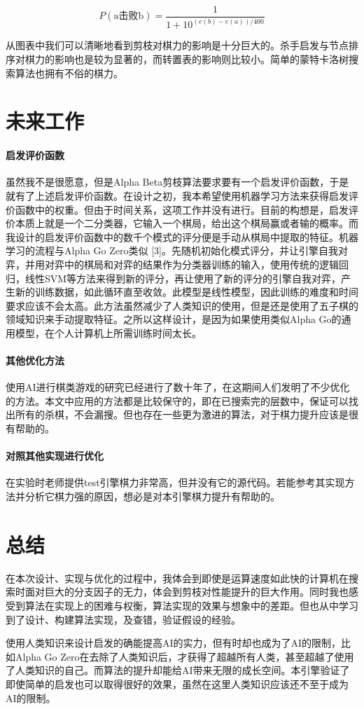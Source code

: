 \documentclass{article}
\begin{document}
\begin{equation}
    P(\mbox{a击败b})=\frac{1}{1+10^{(e(b)-e(a))/400}}
\end{equation}

从图表中我们可以清晰地看到剪枝对棋力的影响是十分巨大的。杀手启发与节点排序对棋力的影响也是较为显著的，而转置表的影响则比较小。简单的蒙特卡洛树搜索算法也拥有不俗的棋力。

\section{未来工作}
\paragraph{启发评价函数} 虽然我不是很愿意，但是Alpha Beta剪枝算法要求要有一个启发评价函数，于是就有了上述启发评价函数。在设计之初，我本希望使用机器学习方法来获得启发评价函数中的权重。但由于时间关系，这项工作并没有进行。目前的构想是，启发评价本质上就是一个二分类器，它输入一个棋局，给出这个棋局赢或者输的概率。而我设计的启发评价函数中的数千个模式的评分便是手动从棋局中提取的特征。机器学习的流程与Alpha Go Zero类似 [3]。先随机初始化模式评分，并让引擎自我对弈，并用对弈中的棋局和对弈的结果作为分类器训练的输入，使用传统的逻辑回归，线性SVM等方法来得到新的评分，再让使用了新的评分的引擎自我对弈，产生新的训练数据，如此循环直至收敛。此模型是线性模型，因此训练的难度和时间要求应该不会太高。此方法虽然减少了人类知识的使用，但是还是使用了五子棋的领域知识来手动提取特征。之所以这样设计，是因为如果使用类似Alpha Go的通用模型，在个人计算机上所需训练时间太长。

\paragraph{其他优化方法} 使用AI进行棋类游戏的研究已经进行了数十年了，在这期间人们发明了不少优化的方法。本文中应用的方法都是比较保守的，即在已搜索完的层数中，保证可以找出所有的杀棋，不会漏搜。但也存在一些更为激进的算法，对于棋力提升应该是很有帮助的。

\paragraph{对照其他实现进行优化} 在实验时老师提供test引擎棋力非常高，但并没有它的源代码。若能参考其实现方法并分析它棋力强的原因，想必是对本引擎棋力提升有帮助的。

\section{总结}

在本次设计、实现与优化的过程中，我体会到即使是运算速度如此快的计算机在搜索时面对巨大的分支因子的无力，体会到剪枝对性能提升的巨大作用。同时我也感受到算法在实现上的困难与权衡，算法实现的效果与想象中的差距。但也从中学习到了设计、构建算法实现，及查错，验证假设的经验。

使用人类知识来设计启发的确能提高AI的实力，但有时却也成为了AI的限制，比如Alpha Go Zero在去除了人类知识后，才获得了超越所有人类，甚至超越了使用了人类知识的自己。而算法的提升却能给AI带来无限的成长空间。本引擎验证了即使简单的启发也可以取得很好的效果，虽然在这里人类知识应该还不至于成为AI的限制。
\end{document}
